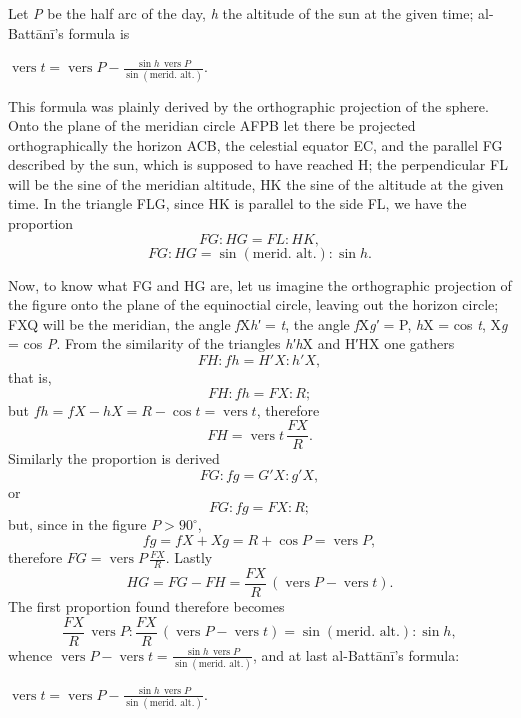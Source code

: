 \documentclass[11pt]{article}
\newcommand{\Pg}[1]{\marginpar{\footnotesize\color{gray}#1}}
\begin{document}
\par \Pg{I 190}Let \emph{P} be the half arc of the day, \emph{h} the altitude of the sun at the given time; al-Battānī's formula is \par\noindent\hspace*{1.5em}$\displaystyle \operatorname{vers} t = \operatorname{vers} P - \frac{\sin h\,\operatorname{vers} P}{\sin(\text{merid. alt.})}.$\par\par
\begin{center}\end{center}
\par This formula was plainly derived by the orthographic projection of the sphere. Onto the plane of the meridian circle AFPB let there be projected orthographically the horizon ACB, the celestial equator EC, and the parallel FG described by the sun, which is supposed to have reached H; the perpendicular FL will be the sine of the meridian altitude, HK the sine of the altitude at the given time. In the triangle FLG, since HK is parallel to the side FL, we have the proportion \[ FG : HG = FL : HK, \] \[ FG : HG = \sin(\text{merid. alt.}) : \sin h. \]\par
\begin{center}\end{center}
\par Now, to know what FG and HG are, let us imagine the orthographic projection of the figure onto the plane of the equinoctial circle, leaving out the horizon circle; FXQ will be the meridian, the angle \emph{f}X\emph{h′} = \emph{t}, the angle \emph{f}X\emph{g′} = P, \emph{h}X = cos \emph{t}, X\emph{g} = cos \emph{P}. From the similarity of the triangles \emph{h′h}X and H′HX one gathers \[ FH : fh = H'X : h'X, \] that is, \[ FH : fh = FX : R; \] but $fh = fX - hX = R - \cos t = \operatorname{vers} t$, therefore \[ FH = \operatorname{vers} t\,\frac{FX}{R}. \] Similarly the proportion is derived \[ FG : fg = G'X : g'X, \] or \[ FG : fg = FX : R; \] but, since in the figure $P > 90^\circ$, \[ fg = fX + Xg = R + \cos P = \operatorname{vers} P, \] therefore $FG = \operatorname{vers} P\,\frac{FX}{R}$. Lastly \[ HG = FG - FH = \frac{FX}{R}\,(\operatorname{vers} P - \operatorname{vers} t). \] The first proportion found therefore becomes \[ \frac{FX}{R}\,\operatorname{vers} P : \frac{FX}{R}\,(\operatorname{vers} P - \operatorname{vers} t) = \sin(\text{merid. alt.}) : \sin h, \] whence $\operatorname{vers} P - \operatorname{vers} t = \frac{\sin h\,\operatorname{vers} P}{\sin(\text{merid. alt.})}$, and at last al-Battānī's formula: \par\noindent\hspace*{1.5em}$\displaystyle \operatorname{vers} t = \operatorname{vers} P - \frac{\sin h\,\operatorname{vers} P}{\sin(\text{merid. alt.})}.$\par\par
\end{document}
